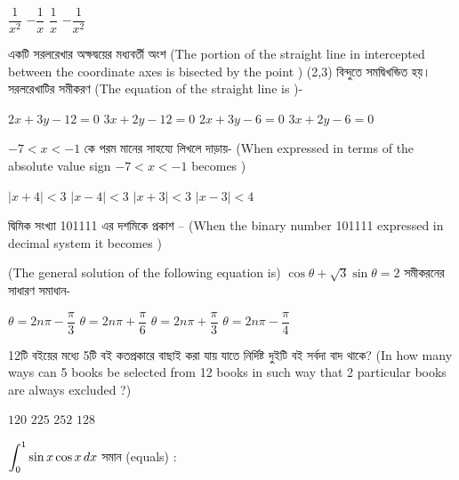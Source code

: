 \documentclass[addpoints]{exam}
\begin{document}
\begin{questions}
\begin{oneparchoices}
\choice $ \dfrac{1}{x^{2}} $
\choice $ -\dfrac{1}{x} $
\choice  $ \dfrac{1}{x} $
\choice $ -\dfrac{1}{x^{2}} $
\end{oneparchoices}

 \question একটি সরলরেখার অক্ষদ্বয়ের মধ্যবর্তী অংশ (The portion of the straight line in intercepted between the coordinate axes is bisected by the point ) (2,3) বিন্দুতে সমদ্বিখন্ডিত হয়। সরলরেখাটির সমীকরণ (The equation of the straight line is )- 

\begin{oneparchoices}
\choice $ 2x+3y-12=0 $
\choice $ 3x+2y-12=0 $
\choice $ 2x+3y-6=0 $
\choice $ 3x+2y-6=0 $
\end{oneparchoices}

\question $ -7<x<-1 $  কে পরম মানের সাহয্যে লিখলে দাড়ায়- (When expressed in terms of the absolute value sign $ -7<x<-1 $ becomes  )

\begin{oneparchoices}
\choice $ |x+4|<3 $
\choice $ |x-4|<3 $
\choice $ |x+3|<3  $
\choice $ |x-3|<4 $
\end{oneparchoices}

\question  দ্বিমিক সংখ্যা 101111 এর দশমিকে প্রকাশ – (When the binary number 101111 expressed in decimal system it becomes )

\begin{oneparchoices}
\end{oneparchoices}

\question (The general solution of the following equation is) $ \cos\theta + \sqrt{3}\sin\theta = 2 $ সমীকরনের সাধারণ সমাধান- 

\begin{oneparchoices}
\choice $ \theta = 2n\pi -\dfrac{\pi}{3} $
\choice $ \theta = 2n\pi +\dfrac{\pi}{6} $
\choice $ \theta = 2n\pi +\dfrac{\pi}{3} $
\choice $ \theta = 2n\pi -\dfrac{\pi}{4} $
\end{oneparchoices}

\question 12টি বইয়ের মধ্যে 5টি বই কতপ্রকারে বাছাই করা যায় যাতে নির্দিষ্ট দুইটি বই সর্বদা বাদ থাকে? (In how many ways can 5 books be selected from 12 books in such way that 2 particular books are always excluded ?)

\begin{oneparchoices}
\choice $ 120 $
\choice $ 225 $
\choice $ 252 $
\choice $ 128 $
\end{oneparchoices}

 \question $ \mathlarger{\int_{0}^{1}\sin x\cos x}\,dx $ সমান (equals) :


\end{questions}
\end{document}
